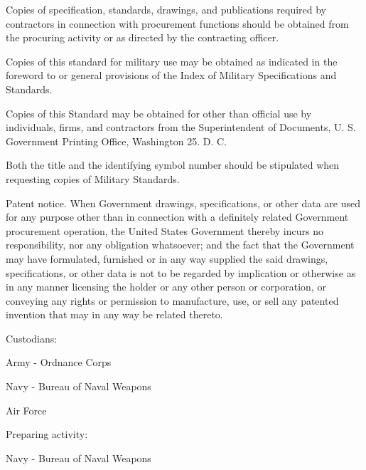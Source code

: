 \documentclass[10pt]{article}
\begin{document}
\clearpage
Copies of specification, standards, drawings, and publications required by contractors in connection with procurement functions should be obtained from the procuring activity or as directed by the contracting officer.

Copies of this standard for military use may be obtained as indicated in the foreword to or general provisions of the Index of Military Specifications and Standards.

Copies of this Standard may be obtained for other than official use by individuals, firms, and contractors from the Superintendent of Documents, U. S. Government Printing Office, Washington 25. D. C.

Both the title and the identifying symbol number should be stipulated when requesting copies of Military Standards.

Patent notice. 
When Government drawings, specifications, or other data are used for any purpose other than in connection with a definitely related Government procurement operation, the United States Government thereby incurs no responsibility, nor any obligation whatsoever; and the fact that the Government may have formulated, furnished or in any way supplied the said drawings, specifications, or other data is not to be regarded by implication or otherwise as in any manner licensing the holder or any other person or corporation, or conveying any rights or permission to manufacture, use, or sell any patented invention that may in any way be related thereto.

\noindent Custodians:

Army - Ordnance Corps

Navy - Bureau of Naval Weapons

Air Force

\noindent Preparing activity:

Navy - Bureau of Naval Weapons
\end{document}
